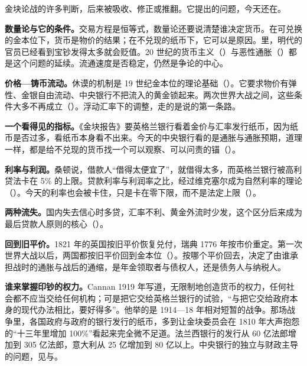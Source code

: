 金块论战的许多判断，后来被吸收、修正或推翻。它提出的问题，今天还在。

\textbf{数量论与它的条件。}交易方程是恒等式，数量论还要说清楚谁决定货币。在可兑换的金本位下，货币是物价的结果；在不兑现的纸币下，它可以是原因。里，明代的官员已经看到宝钞发得太多就会贬值。20 世纪的货币主义（）与恶性通胀（）都是这个问题的延续。流通速度是否稳定，仍然是争论的中心。

\textbf{价格—铸币流动。}休谟的机制是 19 世纪金本位的理论基础（）。它要求物价有弹性、金银自由流动、中央银行不把流入的黄金锁起来。两次世界大战之间，这些条件大多不再成立（）。浮动汇率下的调整，走的是说的第一条路。

\textbf{一个看得见的指标。}《金块报告》要英格兰银行看着金价与汇率发行纸币，因为纸币是否过多，看纸币本身看不出来。今天的中央银行看的是通胀与通胀预期，道理一样，都是给不兑现的货币找一个可以观察、可以问责的锚（）。

\textbf{利率与利润。}桑顿说，借款人“借得太便宜了”，就借得太多，而英格兰银行被高利贷法卡在 5\% 的上限。贷款利率与利润率之比，经过维克塞尔成为自然利率的理论（）。今天的利率也会被卡住，只是卡在零下限，而不是法定上限（）。

\textbf{两种流失。}国内失去信心时多贷，汇率不利、黄金外流时少发，这个区分后来成为最后贷款人原则的核心（）。

\textbf{回到旧平价。}1821 年的英国按旧平价恢复兑付，瑞典 1776 年按市价重定。第一次世界大战以后，两国都按旧平价回到金本位（）。按哪个平价回去，决定了由谁承担战时的通胀与战后的通缩，是年金领取者与债权人，还是债务人与纳税人。

\textbf{谁来掌握印钞的权力。}Cannan 1919 年写道，无限制地创造货币的权力，任何社会都不应当交给任何机构；可是把它交给英格兰银行的试验，“与把它交给政府本身的现代办法相比，要好得多”\cite{cannan1919}。他举的是 1914—18 年相对短暂的战争。那场战争里，各国政府与政府的银行发行的纸币，多到让金块委员会在 1810 年大声抱怨的“十三年里增加 100\%”看起来完全微不足道。法兰西银行的发行从 60 亿法郎增加到 305 亿法郎，意大利从 25 亿增加到 80 亿以上\cite{cannan1919}。中央银行的独立与财政主导的问题，见与。

